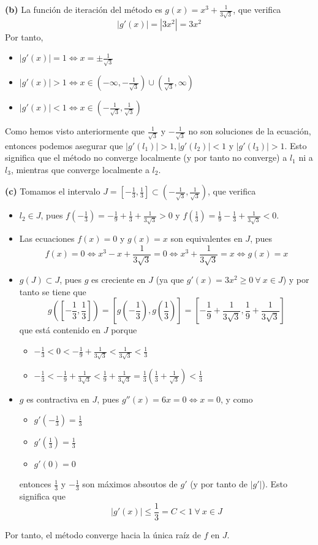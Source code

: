 \documentclass[12pt]{report}
\begin{document}
\vspace{2mm}
\textbf{(b)} La función de iteración del método es $g(x) = x^3 + \frac{1}{3\sqrt{3}}$, que verifica
\[|g'(x)| = |3x^2| = 3x^2\]
Por tanto,
\begin{itemize}
    \item $|g'(x)| = 1 \iff x = \pm\frac{1}{\sqrt{3}}$
    \item $|g'(x)| > 1 \iff x \in (-\infty, -\frac{1}{\sqrt{3}}) \cup (\frac{1}{\sqrt{3}},\infty)$
    \item $|g'(x)| < 1 \iff x \in (-\frac{1}{\sqrt{3}},\frac{1}{\sqrt{3}})$
\end{itemize}
Como hemos visto anteriormente que $\frac{1}{\sqrt{3}}$ y $-\frac{1}{\sqrt{3}}$ no son soluciones de la ecuación, entonces podemos asegurar que $|g'(l_1)| > 1, |g'(l_2)| < 1$ y $|g'(l_3)| > 1$. Esto significa que el método no converge localmente (y por tanto no converge) a $l_1$ ni a $l_3$, mientras que converge localmente a $l_2$.

\vspace{2mm}
\textbf{(c)} Tomamos el intervalo $J = [-\frac{1}{3},\frac{1}{3}] \subset (-\frac{1}{\sqrt{3}},\frac{1}{\sqrt{3}})$, que verifica
\begin{itemize}
    \item $l_2 \in J$, pues $f(-\frac{1}{3}) = -\frac{1}{9} + \frac{1}{3} + \frac{1}{3\sqrt{3}} > 0$ y $f(\frac{1}{3}) = \frac{1}{9} - \frac{1}{3} + \frac{1}{3\sqrt{3}} < 0$.
    \item Las ecuaciones $f(x) = 0$ y $g(x) = x$ son equivalentes en $J$, pues
    \[f(x) = 0 \iff x^3 - x + \frac{1}{3\sqrt{3}} = 0 \iff x^3 + \frac{1}{3\sqrt{3}} = x \iff g(x) = x\]
    \item $g(J) \subset J$, pues $g$ es creciente en $J$ (ya que $g'(x) = 3x^2 \geq 0 \ \forall \ x \in J$) y por tanto se tiene que
    \[g([-\frac{1}{3},\frac{1}{3}]) = [g(-\frac{1}{3}),g(\frac{1}{3})] = [-\frac{1}{9} + \frac{1}{3\sqrt{3}},\frac{1}{9} + \frac{1}{3\sqrt{3}}]\]
    que está contenido en $J$ porque
    \begin{itemize}
        \item $\displaystyle -\frac{1}{3} < 0 < -\frac{1}{9}+\frac{1}{3\sqrt{3}} < \frac{1}{3\sqrt{3}} < \frac{1}{3}$
        \item $\displaystyle -\frac{1}{3} < -\frac{1}{9} + \frac{1}{3\sqrt{3}} < \frac{1}{9} + \frac{1}{3\sqrt{3}} = \frac{1}{3}(\frac{1}{3} + \frac{1}{\sqrt{3}}) < \frac{1}{3}$
    \end{itemize}
    \item $g$ es contractiva en $J$, pues $g''(x) = 6x = 0 \iff x = 0$, y como
    \begin{itemize}
        \item $g'(-\frac{1}{3}) = \frac{1}{3}$
        \item $g'(\frac{1}{3}) = \frac{1}{3}$
        \item $g'(0) = 0$
    \end{itemize}
    entonces $\frac{1}{3}$ y $-\frac{1}{3}$ son máximos absoutos de $g'$ (y por tanto de $|g'|$). Esto significa que
    \[|g'(x)| \leq \frac{1}{3} = C < 1 \ \forall \ x \in J\]
\end{itemize}
Por tanto, el método converge hacia la única raíz de $f$ en $J$.
\end{document}
